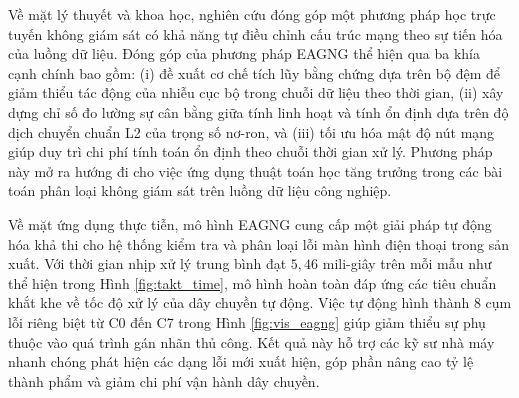 Về mặt lý thuyết và khoa học, nghiên cứu đóng góp một phương pháp học trực tuyến không giám sát có khả năng tự điều chỉnh cấu trúc mạng theo sự tiến hóa của luồng dữ liệu. Đóng góp của phương pháp EAGNG thể hiện qua ba khía cạnh chính bao gồm: (i) đề xuất cơ chế tích lũy bằng chứng dựa trên bộ đệm để giảm thiểu tác động của nhiễu cục bộ trong chuỗi dữ liệu theo thời gian, (ii) xây dựng chỉ số đo lường sự cân bằng giữa tính linh hoạt và tính ổn định dựa trên độ dịch chuyển chuẩn L2 của trọng số nơ-ron, và (iii) tối ưu hóa mật độ nút mạng giúp duy trì chi phí tính toán ổn định theo chuỗi thời gian xử lý. Phương pháp này mở ra hướng đi cho việc ứng dụng thuật toán học tăng trưởng \cite{fritzke1995growing, furao2006soinn} trong các bài toán phân loại không giám sát trên luồng dữ liệu công nghiệp.

Về mặt ứng dụng thực tiễn, mô hình EAGNG cung cấp một giải pháp tự động hóa khả thi cho hệ thống kiểm tra và phân loại lỗi màn hình điện thoại trong sản xuất. Với thời gian nhịp xử lý trung bình đạt $5{,}46$ mili-giây trên mỗi mẫu như thể hiện trong Hình \ref{fig:takt_time}, mô hình hoàn toàn đáp ứng các tiêu chuẩn khắt khe về tốc độ xử lý của dây chuyền tự động. Việc tự động hình thành $8$ cụm lỗi riêng biệt từ C0 đến C7 trong Hình \ref{fig:vis_eagng} giúp giảm thiểu sự phụ thuộc vào quá trình gán nhãn thủ công. Kết quả này hỗ trợ các kỹ sư nhà máy nhanh chóng phát hiện các dạng lỗi mới xuất hiện, góp phần nâng cao tỷ lệ thành phẩm và giảm chi phí vận hành dây chuyền.